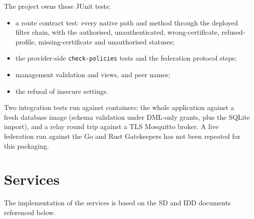 \documentclass[a4paper]{arrowhead}
\begin{document}
The project owns these JUnit tests:
\begin{itemize}
\item a route contract test: every native path and method through the deployed filter chain, with the authorised, unauthenticated, wrong-certificate, refused-profile, missing-certificate and unauthorised statuses;
\item the provider-side \texttt{check-\allowbreak{}policies} tests and the federation protocol steps;
\item management validation and views, and peer names;
\item the refusal of insecure settings.
\end{itemize}
Two integration tests run against containers: the whole application against a fresh database image (schema validation under DML-only grants, plus the SQLite import), and a relay round trip against a TLS Mosquitto broker. A live federation run against the Go and Rust Gatekeepers has not been repeated for this packaging.


\newpage

\section{Services}
\label{sec:services}

The implementation of the services is based on the SD and IDD documents referenced below.
\end{document}
